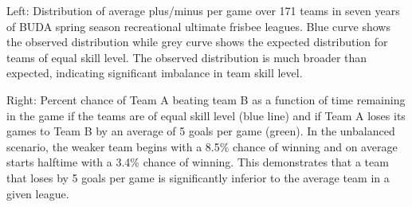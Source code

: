 Left: Distribution of average plus/minus per game over 171 teams in seven years of BUDA spring season recreational ultimate frisbee leagues.  Blue curve shows the observed distribution while grey curve shows the expected distribution for teams of equal skill level. The observed distribution is much broader than expected, indicating significant imbalance in team skill level. 

Right: Percent chance of Team A beating team B as a function of time remaining in the game if the teams are of equal skill level (blue line) and if Team A loses its games to Team B by an average of 5 goals per game (green). In the unbalanced scenario, the weaker team begins with a 8.5\% chance of winning and on average starts halftime with a 3.4\% chance of winning. This demonstrates that a team that loses by 5 goals per game is significantly inferior to the average team in a given league. \label{fig:buda_performance}